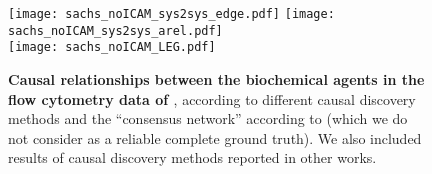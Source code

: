 \documentclass[twoside,11pt]{article}
\newcommand{\boldcap}[1]{\textbf{#1}}
\begin{document}
\begin{figure}\centering
\texttt{[image: sachs\_noICAM\_sys2sys\_edge.pdf]}
\quad
\texttt{[image: sachs\_noICAM\_sys2sys\_arel.pdf]}\\
\texttt{[image: sachs\_noICAM\_LEG.pdf]}
  \caption{\boldcap{Causal relationships between the biochemical agents in the flow cytometry data of \cite{SPP05}}, according to different causal discovery methods and the ``consensus network'' according to \cite{SPP05} (which we do not consider as a reliable complete ground truth). We also included results of causal discovery methods reported in other works.
  \label{fig:comparisonSachs}}
\end{figure}
\end{document}
